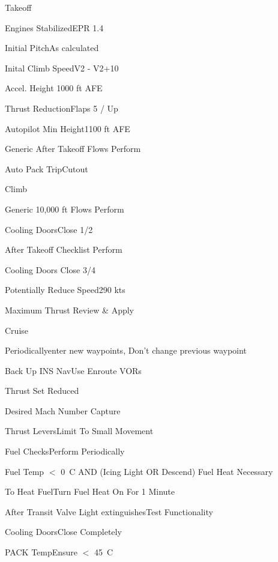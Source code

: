 \documentclass[sim-use]{checklist}
\begin{document}
\begin{checklist}{Takeoff}
    \item{Engines Stabilized}{EPR 1.4}
    \item{Initial Pitch}{As calculated}
    \item{Inital Climb Speed}{V2 - V2+10}
    \item{Accel. Height} {1000 ft AFE}
    \item{Thrust Reduction}{Flaps 5 / Up}
    \item{Autopilot Min Height}{1100 ft AFE}
    \item {Generic After Takeoff Flows} {Perform}
     {
        \item{Auto Pack Trip}{Cutout}
    }
\end{checklist}

\begin{checklist}{Climb}
     {
        \item{Generic 10,000 ft Flows} {Perform}
        \item{Cooling Doors}{Close 1/2}
        \item{After Takeoff Checklist} {Perform}
    }
     {
        \item{Cooling Doors} {Close 3/4}
    }
     {
        \item{Potentially Reduce Speed}{290 kts}
    }
     {
        \item{Maximum Thrust} {Review \& Apply}
    }
\end{checklist}

\begin{checklist}{Cruise}
    \item{Periodically}{enter new waypoints, Don't change previous waypoint}
    \item{Back Up INS Nav}{Use Enroute VORs}
     {
        \item{Thrust} {Set Reduced}
        \item{Desired Mach Number} {Capture}
        \item{Thrust Levers}{Limit To Small Movement}
    }
    \item{Fuel Checks}{Perform Periodically}
\end{checklist}

\begin{continuedchecklist}
     {
        \item{Fuel Temp $<$ 0\degree\ C AND (Icing Light OR Descend)} {Fuel Heat Necessary}
        \item{To Heat Fuel}{Turn Fuel Heat On For 1 Minute}
        \item{After Transit Valve Light extinguishes}{Test Functionality}
    }
     {
        \item{Cooling Doors}{Close Completely}
        \item{PACK Temp}{Ensure $<$ 45\degree\ C}
    }
\end{continuedchecklist}
\end{document}
